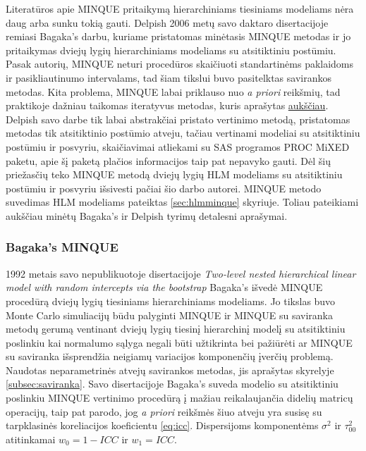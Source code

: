 \documentclass[12pt,a4paper]{article}
\begin{document}
\indent Literatūros apie MINQUE pritaikymą hierarchiniams tiesiniams modeliams nėra daug arba sunku tokią gauti. Delpish\cite{delpish} 2006 metų savo daktaro disertacijoje remiasi Bagaka's\cite{bagaka} darbu, kuriame pristatomas minėtasis MINQUE metodas ir jo pritaikymas dviejų lygių hierarchiniams modeliams su atsitiktiniu postūmiu. Pasak autorių, MINQUE neturi procedūros skaičiuoti standartinėms paklaidoms ir pasikliautinumo intervalams, tad šiam tikslui buvo pasitelktas savirankos metodas. Kita problema, MINQUE labai priklauso nuo \textit{a priori} reikšmių, tad praktikoje dažniau taikomas iteratyvus metodas, kuris aprašytas \hyperlink{iminque}{aukščiau}. Delpish savo darbe tik labai abstrakčiai pristato vertinimo metodą, pristatomas metodas tik atsitiktinio postūmio atveju, tačiau vertinami modeliai su atsitiktiniu postūmiu ir posvyriu, skaičiavimai atliekami su SAS programos PROC MiXED paketu, apie šį paketą plačios informacijos taip pat nepavyko gauti. Dėl šių priežasčių teko MINQUE metodą dviejų lygių HLM modeliams su atsitiktiniu postūmiu ir posvyriu išsivesti pačiai šio darbo autorei. MINQUE metodo suvedimas HLM modeliams pateiktas \ref{sec:hlmminque} skyriuje. Toliau pateikiami aukščiau minėtų Bagaka's ir Delpish tyrimų detalesni aprašymai.


\subsubsection{Bagaka's MINQUE}
1992 metais savo nepublikuotoje disertacijoje \textit{Two-level nested hierarchical linear model with random intercepts via the bootstrap}\cite{bagaka} Bagaka's išvedė MINQUE procedūrą dviejų lygių tiesiniams hierarchiniams modeliams. Jo tikslas buvo Monte Carlo simuliacijų būdu palyginti MINQUE ir MINQUE su saviranka metodų gerumą ventinant dviejų lygių tiesinį hierarchinį modelį su atsitiktiniu poslinkiu kai normalumo sąlyga negali būti užtikrinta bei pažiūrėti ar MINQUE su saviranka išsprendžia neigiamų variacijos komponenčių įverčių problemą. Naudotas neparametrinės atvejų savirankos metodas, jis aprašytas skyrelyje \ref{subsec:saviranka}. Savo disertacijoje Bagaka's suveda modelio su atsitiktiniu poslinkiu MINQUE vertinimo procedūrą į mažiau reikalaujančia didelių matricų operacijų, taip pat parodo, jog \textit{a priori} reikšmės šiuo atveju yra susisę su tarpklasinės koreliacijos koeficientu \ref{eq:icc}. Dispersijoms komponentėms $\sigma^2$ ir $\tau_{00}^2$ atitinkamai $w_0=1-ICC$ ir $w_1=ICC$.
\end{document}
